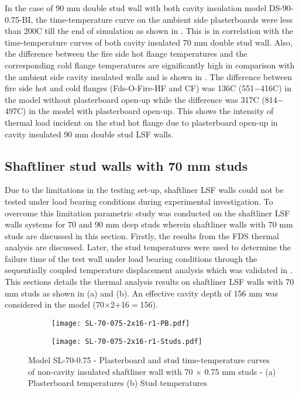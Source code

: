In the case of 90 mm double stud wall with both cavity insulation model DS-90-0.75-BI, the time-temperature curve on the ambient side plasterboards were less than 200\degree C till the end of simulation as shown in . This is in correlation with the time-temperature curves of both cavity insulated 70 mm double stud wall. Also, the difference between the fire side hot flange temperatures and the corresponding cold flange temperatures are significantly high in comparison with the ambient side cavity insulated walls and is shown in . The difference between fire side hot and cold flanges (Fds-O-Fire-HF and CF) was 136\degree C (551\degree$-$416\degree C) in the model without plasterboard open-up while the difference was 317\degree C (814\degree$-$497\degree C) in the model with plasterboard open-up. This shows the intensity of thermal load incident on the stud hot flange due to plasterboard open-up in cavity insulated 90 mm double stud LSF walls.   

\subsection{Shaftliner stud walls with 70 mm studs}

Due to the limitations in the testing set-up, shaftliner LSF walls could not be tested under load bearing conditions during experimental investigation. To overcome this limitation parametric study was conducted on the shaftliner LSF walls systems for 70 and 90 mm deep studs wherein shaftliner walls with 70 mm studs are discussed in this section. Firstly, the results from the FDS thermal analysis are discussed. Later, the stud temperatures were used to determine the failure time of the test wall under load bearing conditions through the sequentially coupled temperature displacement analysis which was validated in . This sections details the thermal analysis results on shaftliner LSF walls with 70 mm studs as shown in  (a) and (b). An effective cavity depth of 156 mm was considered in the model (70$\times$2$+$16$=$156). 
\begin{figure}[!htbp]
	\centering
	\begin{subfigure}[b]{0.6\textwidth}
		\centering
		\texttt{[image: SL-70-075-2x16-r1-PB.pdf]}
		\caption{}
		\label{subfig:SL-70-075-2x16-r1-PB}
	\end{subfigure}
	\begin{subfigure}[b]{0.6\textwidth}
		\centering
		\texttt{[image: SL-70-075-2x16-r1-Studs.pdf]}
		\caption{}
		\label{subfig:SL-70-075-2x16-r1-Studs}
	\end{subfigure}
	   \caption{Model SL-70-0.75 - Plasterboard and stud time-temperature curves of non-cavity insulated shaftliner wall with 70 $\times$ 0.75 mm studs - (a) Plasterboard temperatures (b) Stud temperatures}
	   \label{fig:SL-70-075-2x16-r1}
\end{figure}

